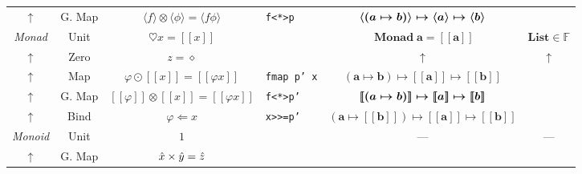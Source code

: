 \documentclass{jsarticle}
\def\[{[\![}
\def\]{]\!]}
\newcommand{\boldsym}[1]{{\boldsymbol{#1}}}
\newcommand{\htypename}[1]{\mathbf{#1}}
\newcommand{\htypeclassname}[1]{\mathbb{#1}}
\begin{document}
\begin{center}
\begin{tabular}{||c|c||c|l|c|c||}
    &\\
    \hline
$\uparrow$
    &G. Map
    &$\langle f\rangle\otimes\langle\phi\rangle=\langle f\phi\rangle$
    &\texttt{f<*>p}
    &$\boldsym{\langle}(\boldmath{a}\mapsto\boldmath{b})\boldsym{\rangle}\mapsto\boldsym{\langle a\rangle}\mapsto\boldsym{\langle b\rangle}$
    &\\
    \hline
    \hline
\textsl{Monad}
    &Unit
    &$\heartsuit x=\[x\]$
    &
    &$\mathop{\textbf{Monad}}\htypename{a}=\boldsym{\[a\]}$
    &$\textbf{List}\in\htypeclassname{F}$\\
    \hline
$\uparrow$
    &Zero
    &$z=\diamond$
    &
    &$\uparrow$
    &$\uparrow$\\
    \hline
$\uparrow$
    &Map
    &$\varphi\odot\[x\]=\[\varphi x\]$
    &\texttt{fmap p' x}
    &$(\htypename{a}\mapsto\htypename{b})\mapsto\boldsym{\[a\]}\mapsto\boldsym{\[b\]}$
    &\\
    \hline
$\uparrow$
    &G. Map
    &$\[\varphi\]\otimes\[x\]=\[\varphi x\]$
    &\texttt{f<*>p'}
    &$\boldsym{\[}(\boldmath{a}\mapsto\boldmath{b})\boldsym{\]}\mapsto\boldsym{\[a\]}\mapsto\boldsym{\[b\]}$
    &\\
    \hline
$\uparrow$
    &Bind
    &$\varphi\Leftarrow x$
    &\texttt{x>>=p'}
    &$(\htypename{a}\mapsto\boldsym{\[b\]})\mapsto\boldsym{\[a\]}\mapsto\boldsym{\[b\]}$
    &\\
    \hline
    \hline
\textsl{Monoid}
    &Unit
    &$1$
    &
    &---
    &---\\
    \hline
$\uparrow$
    &G. Map
    &$\Hat{x}\times\Hat{y}=\Hat{z}$
    &
    &
    &\\
    \hline
\end{tabular}
\end{center}
\end{document}
